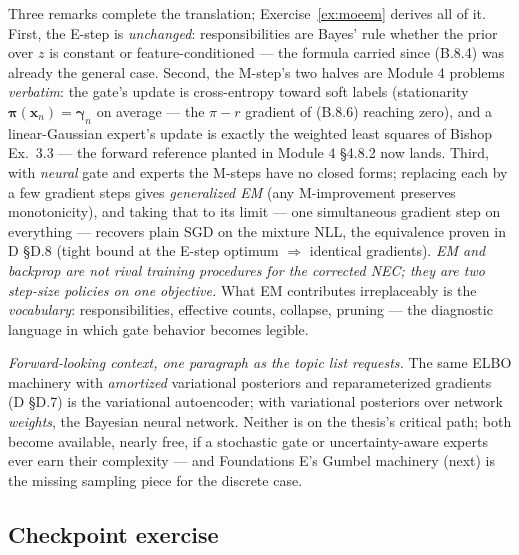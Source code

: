 \documentclass[11pt]{article}
\numberwithin{equation}{section}
\theoremstyle{plain}
\theoremstyle{definition}
\theoremstyle{remark}
\newcounter{exercise}
\newcommand{\x}{\bm{x}}
\newcommand{\bpi}{\bm{\pi}}
\newcommand{\resp}{\gamma}
\begin{document}
Three remarks complete the translation; Exercise~\ref{ex:moeem} derives all of it. First, the E-step is \emph{unchanged}: responsibilities are Bayes' rule whether the prior over $z$ is constant or feature-conditioned --- the formula carried since (B.8.4) was already the general case. Second, the M-step's two halves are Module 4 problems \emph{verbatim}: the gate's update is cross-entropy toward soft labels (stationarity $\bpi(\x_n) = \bm\resp_n$ on average --- the $\pi - r$ gradient of (B.8.6) reaching zero), and a linear-Gaussian expert's update is exactly the weighted least squares of Bishop Ex.\ 3.3 --- the forward reference planted in Module 4 \S4.8.2 now lands. Third, with \emph{neural} gate and experts the M-steps have no closed forms; replacing each by a few gradient steps gives \emph{generalized EM} (any M-improvement preserves monotonicity), and taking that to its limit --- one simultaneous gradient step on everything --- recovers plain SGD on the mixture NLL, the equivalence proven in D \S D.8 (tight bound at the E-step optimum $\Rightarrow$ identical gradients). \emph{EM and backprop are not rival training procedures for the corrected NEC; they are two step-size policies on one objective.} What EM contributes irreplaceably is the \emph{vocabulary}: responsibilities, effective counts, collapse, pruning --- the diagnostic language in which gate behavior becomes legible.

\emph{Forward-looking context, one paragraph as the topic list requests.} The same ELBO machinery with \emph{amortized} variational posteriors and reparameterized gradients (D \S D.7) is the variational autoencoder; with variational posteriors over network \emph{weights}, the Bayesian neural network. Neither is on the thesis's critical path; both become available, nearly free, if a stochastic gate or uncertainty-aware experts ever earn their complexity --- and Foundations E's Gumbel machinery (next) is the missing sampling piece for the discrete case.


\subsection*{Checkpoint exercise}
\end{document}
